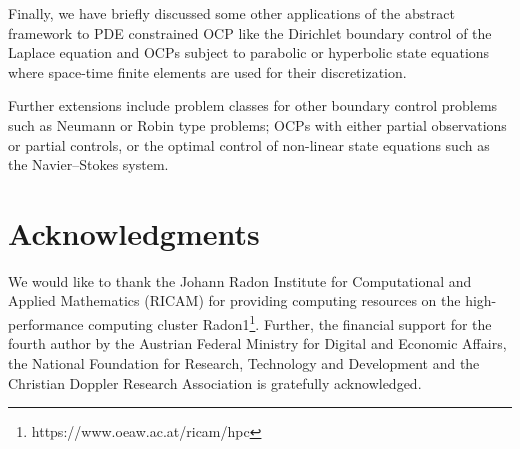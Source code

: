 \documentclass{article}
\newcommand{\red}[1]{{\color{red}{#1}}}
\numberwithin{equation}{section}
\begin{document}
Finally, we have briefly discussed some other applications of the abstract 
framework to PDE constrained OCP like the  Dirichlet boundary control of
the Laplace equation and OCPs subject to parabolic or hyperbolic state
equations where space-time finite elements are used for their discretization.

Further extensions include problem classes for other boundary control problems
such as Neumann or Robin type problems; OCPs with either partial observations
or partial controls, or the optimal control of non-linear state equations
such as the Navier--Stokes system.

%
%
% 
\section*{Acknowledgments}
We would like to thank 
the Johann Radon Institute for Computational and Applied Mathematics (RICAM) 
for providing computing resources on the high-performance computing cluster
Radon1\footnote{https://www.oeaw.ac.at/ricam/hpc}.
Further, the financial support for the fourth author by the
Austrian Federal Ministry for Digital and Economic Affairs, the National
Foundation for Research, Technology and Development and the Christian
Doppler Research Association is gratefully acknowledged.

% 	
	



  


 
  
\end{document}
